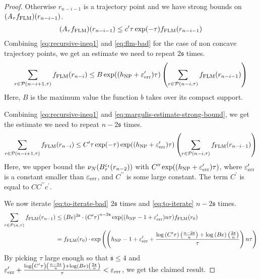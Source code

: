 \begin{proof}
  Otherwise $r_{n-i-1}$ is a \concave trajectory point and we have strong bounds on $(A_{\tau} f_{\mathrm{FLM}})(r_{n-i-1})$.
  \begin{align}
    \label{eq:margulis-estimate-strong-bound}
    (A_{\tau}f_{\mathrm{FLM}})(r_{n-i-1}) \leq c^{\prime} \tau \exp(-\tau) f_{\mathrm{FLM}}(r_{n-i-1})
  \end{align}
  Combining \eqref{eq:recursive-ineq1} and \eqref{eq:flm-bad} for the case of non concave trajectory points, we get an estimate we need to repeat $2 \mathfrak{s}$ times.
  \begin{align}
    \label{eq:to-iterate-bad}
    \sum_{r \in \mathcal{P}(n-i+1, \tau)} f_{\mathrm{FLM}}(r_{n-i}) \leq B \exp((h_{\mathrm{NP}} + \varepsilon_{\mathrm{err}}^{\prime})\tau) \left( \sum_{r \in \mathcal{P}(n-i, \tau)} f_{\mathrm{FLM}}(r_{n-i-1}) \right)
  \end{align}
  Here, $B$ is the maximum value the function $b$ takes over its compact support.

  Combining \eqref{eq:recursive-ineq1} and \eqref{eq:margulis-estimate-strong-bound}, we get the estimate we need to repeat $n - 2\mathfrak{s}$ times.
  \begin{align}
    \label{eq:to-iterate}
    \sum_{r \in \mathcal{P}(n-i+1, \tau)} f_{\mathrm{FLM}}(r_{n-i}) \leq C^{\prime} \tau \exp(-\tau) \exp((h_{\mathrm{NP}} + \varepsilon_{\mathrm{err}}^{\prime})\tau) \left( \sum_{r \in \mathcal{P}(n-i, \tau)} f_{\mathrm{FLM}}(r_{n-i-1}) \right)
  \end{align}
  Here, we upper bound the $\nu_N(B_{\tau}^{\varepsilon_t}(r_{n-2}))$ with $C^{\prime \prime} \exp((h_{\mathrm{NP}} + \varepsilon_{\mathrm{err}}^{\prime})\tau)$, where $\varepsilon_{\mathrm{err}}^{\prime}$ is a constant smaller than $\varepsilon_{\mathrm{err}}$, and $C^{\prime \prime}$ is some large constant.
  The term $C^{\prime}$ is equal to $C C^{\prime \prime} c^{\prime}$.

  We now iterate \eqref{eq:to-iterate-bad} $2\mathfrak{s}$ times and \eqref{eq:to-iterate} $n-2\mathfrak{s}$ times.
  \begin{align*}
    \sum_{r \in \mathcal{P}(n, \tau)} f_{\mathrm{FLM}}(r_{n-1}) &\leq (Be)^{2\mathfrak{s}} \cdot \left( C^{\prime} \tau \right)^{n- 2 \mathfrak{s}} \exp((h_{\mathrm{NP}} - 1 + \varepsilon_{\mathrm{err}}^{\prime})n\tau) f_{\mathrm{FLM}}(r_0) \\
                                              &= f_{\mathrm{FLM}}(r_0) \cdot \exp\left( \left( h_{\mathrm{NP}} - 1 + \varepsilon_{\mathrm{err}}^{\prime} + \frac{\log\left( C^{\prime} \tau  \right)\left(  \frac{n- 2\mathfrak{s}}{n} \right) + \log\left( Be \right)\left( \frac{2\mathfrak{s}}{n} \right)}{\tau} \right) n\tau \right)
  \end{align*}
  By picking $\tau$ large enough so that $\mathfrak{s} \leq 4$ and  $\varepsilon_{\mathrm{err}}^{\prime} + \frac{\log\left( C^{\prime} \tau  \right)\left(  \frac{n- 2\mathfrak{s}}{n} \right) + \log\left( Be \right)\left( \frac{2\mathfrak{s}}{n} \right)}{\tau} < \varepsilon_{\mathrm{err}}$, we get the claimed result.
\end{proof}

